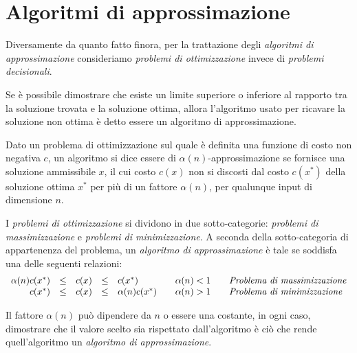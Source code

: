 \section{Algoritmi di approssimazione}
Diversamente da quanto fatto finora, per la trattazione degli \emph{algoritmi
di approssimazione} consideriamo \emph{problemi di ottimizzazione} invece di
\emph{problemi decisionali}.

\begin{definition}
    Se è possibile dimostrare che esiste un limite superiore o inferiore al
    rapporto tra la soluzione trovata e la soluzione ottima, allora l'algoritmo
    usato per ricavare la soluzione non ottima è detto essere un algoritmo di
    approssimazione.
\end{definition}
\begin{definition}
    Dato un problema di ottimizzazione sul quale è definita una funzione di costo
    non negativa $c$, un algoritmo si dice essere di $\alpha(n)$-approssimazione
    se fornisce una soluzione ammissibile $x$, il cui costo $c(x)$ non si discosti
    dal costo $c(x^*)$ della soluzione ottima $x^*$ per più di un fattore
    $\alpha(n)$, per qualunque input di dimensione $n$.
\end{definition}

\noindent
I \emph{problemi di ottimizzazione} si dividono in due sotto-categorie:
\emph{problemi di massimizzazione} e \emph{problemi di minimizzazione}.
A seconda della sotto-categoria di appartenenza del problema, un \emph{algoritmo
di approssimazione} è tale se soddisfa una delle seguenti relazioni:
\[\begin{array}{rccclll}
    \alpha(n)c(x^*) & \leq & c(x) & \leq & c(x^*) & \quad\alpha(n)<1 & \quad\emph{Problema di massimizzazione}\\
    c(x^*) & \leq & c(x) & \leq & \alpha(n)c(x^*) & \quad\alpha(n)>1 & \quad\emph{Problema di minimizzazione}
\end{array}\]

\begin{note}
    Il fattore $\alpha(n)$ può dipendere da $n$ o essere una costante, in ogni
    caso, dimostrare che il valore scelto sia rispettato dall'algoritmo è ciò che
    rende quell'algoritmo un \emph{algoritmo di approssimazione}.
\end{note}

